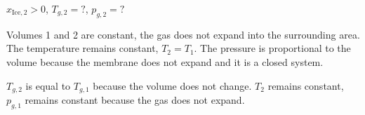 \( x_{\text{Ice},2} > 0 \), \( T_{g,2} = ? \), \( p_{g,2} = ? \)  

Volumes 1 and 2 are constant, the gas does not expand into the surrounding area. The temperature remains constant, \( T_2 = T_1 \).  
The pressure is proportional to the volume because the membrane does not expand and it is a closed system.  

\( T_{g,2} \) is equal to \( T_{g,1} \) because the volume does not change.  
\( T_2 \) remains constant, \( p_{g,1} \) remains constant because the gas does not expand.